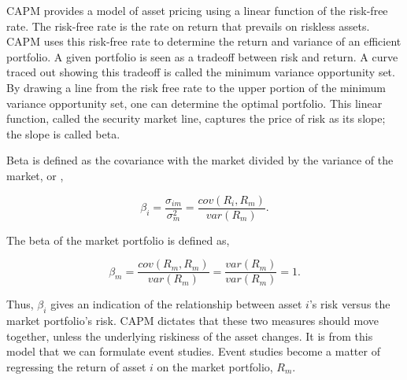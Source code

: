 CAPM provides a model of asset pricing using a linear function of the risk-free rate. The risk-free rate is the rate on return that prevails on riskless assets. CAPM uses this risk-free rate to determine the return and variance of an efficient portfolio. A given portfolio is seen as a tradeoff between risk and return. A curve traced out showing this tradeoff is called the minimum variance opportunity set. By drawing a line from the risk free rate to the upper portion of the minimum variance opportunity set, one can determine the optimal portfolio. This linear function, called the security market line, captures the price of risk as its slope; the slope is called beta.

Beta is defined as the covariance with the market divided by the variance of the market, or \cite[p. 198]{copeland},

\begin{equation}
\beta_{i}=\frac{\sigma_{im}}{\sigma_{m}^{2}}=\frac{cov(R_{i},R_{m})}{var(R_{m})}.
\end{equation}

The beta of the market portfolio is defined as,

\begin{equation}
\beta_{m}=\frac{cov(R_{m},R_{m})}{var(R_{m})}=\frac{var(R_{m})}{var(R_{m})}=1.
\end{equation}

Thus, $\beta_{i}$ gives an indication of the relationship between asset $i$'s risk versus the market portfolio's risk. CAPM dictates that these two measures should move together, unless the underlying riskiness of the asset changes. It is from this model that we can formulate event studies. Event studies become a matter of regressing the return of asset $i$ on the market portfolio, $R_{m}$.

%

